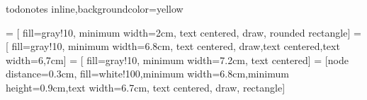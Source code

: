 
%
\usepackage[ngerman]{babel} 	%
\usepackage[utf8]{inputenc}
\usepackage[german=quotes]{csquotes} 	%
\usepackage[T1]{fontenc}
\usepackage{epigraph}
\usepackage{booktabs}
\usepackage{tabularx}
\usepackage{diagbox}
\usepackage[dvipsnames]{xcolor}
\usepackage{chngcntr}
\usepackage{enumitem}
\usepackage{minted}
\usepackage{wasysym}

\usepackage{todonotes}
\presetkeys%
    {todonotes}%
    {inline,backgroundcolor=yellow}{}
    

\usepackage{amsmath}
\usepackage{amssymb}

\usepackage[hidelinks]{hyperref}

\usepackage{pgfplots}
\pgfplotsset{compat=newest}
\usetikzlibrary{patterns}
\makeatletter
{}%
{
    \pgfsetcolor{\tikz@pattern@color}
    \pgfsetlinewidth{0.4pt}
    \pgfpathmoveto{\pgfqpoint{0pt}{0pt}}
    \pgfpathlineto{\pgfqpoint{\LineSpace + 0.1pt}{\LineSpace + 0.1pt}}
}
\makeatother
\newdimen\LineSpace
{}

\usepackage{customizing/listingsstyles}
\usepackage{amsthm}                     %
\usepackage[framemethod=tikz]{mdframed} %


\usepackage{tikz}
\usetikzlibrary{shapes.misc,arrows,calc,positioning,positioning,fit,calc}

 = [ fill=gray!10, minimum width=2cm, text centered, draw, rounded rectangle]
 = [ fill=gray!10, minimum width=6.8cm, text centered, draw,text centered,text width=6,7cm]
 = [ fill=gray!10, minimum width=7.2cm, text centered]
 = [node distance=0.3cm,  fill=white!100,minimum width=6.8cm,minimum height=0.9cm,text width=6.7cm, text centered, draw, rectangle]

\newcommand{\TitelDerArbeit}[1]{\def\DerTitelDerArbeit{#1}\hypersetup{pdftitle={#1}}}
\newcommand{\AutorDerArbeit}[1]{\def\DerAutorDerArbeit{#1}\hypersetup{pdfauthor={#1}}}
\newcommand{\Firma}[1]{\def\DerNameDerFirma{#1}}
\newcommand{\Kurs}[1]{\def\DieKursbezeichnung{#1}}
\usepackage{nameref}
\usepackage{fnpct}

